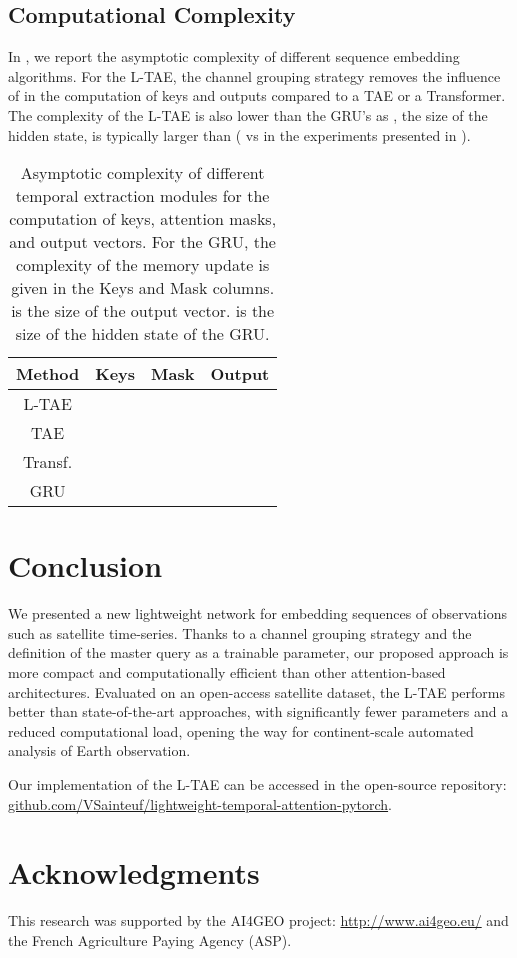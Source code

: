 \documentclass[runningheads]{llncs}
\begin{document}
\subsection{Computational Complexity}
In , we report the asymptotic complexity of different sequence embedding algorithms. For the L-TAE, the channel grouping strategy removes the influence of  in the computation of keys and outputs compared to a TAE or a Transformer. The complexity of the L-TAE is also lower than the GRU's as , the size of the hidden state, is typically larger than  ( vs  in the experiments presented in ). 
\begin{table}[]
  \caption{Asymptotic complexity of different temporal extraction modules for the computation of keys, attention masks, and output vectors. For the GRU, the complexity of the memory update is given in the Keys and Mask columns.  is the size of the output vector.  is the size of the hidden state of the GRU.}
    \label{tab:complexity}
    \centering
\begin{tabular}{c@{\quad}c@{\quad}c@{\quad}c}
    Method & Keys &  Mask & Output \\\toprule
    L-TAE &  & &   \\
    TAE &   &  &   \\
    Transf. &  &  &  \\
    GRU &  \multicolumn{2}{c}{} &   \\\bottomrule
\end{tabular}
\end{table} \section{Conclusion}
We presented a new lightweight network for embedding sequences of observations such as satellite time-series. Thanks to a channel grouping strategy and the definition of the master query as a trainable parameter, our proposed approach is more compact and computationally efficient than other attention-based architectures.
Evaluated on an open-access satellite dataset, the L-TAE performs better than state-of-the-art approaches, with significantly fewer parameters and a reduced computational load, opening the way for continent-scale automated analysis of Earth observation.

Our implementation of the L-TAE can be accessed in the open-source repository: \url{github.com/VSainteuf/lightweight-temporal-attention-pytorch}.
\section*{Acknowledgments}
This research was supported by the AI4GEO project: \url{http://www.ai4geo.eu/} and the French Agriculture Paying Agency (ASP).
\end{document}

